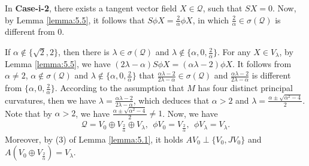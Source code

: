 \documentclass[reqno]{amsart}%
\theoremstyle{definition}
\numberwithin{equation}{section}
\begin{document}
In {\bf Case-i-2}, there exists a tangent vector field $X\in\mathcal{Q}$, such that
$SX=0$. Now, by Lemma \ref{lemma:5.5}, it follows that $S\phi X=\tfrac{2}{\alpha}\phi X$, in which $\tfrac{2}{\alpha}\in\sigma(\mathcal{Q})$ is different from $0$.

If $\alpha\notin\{\sqrt{2},2\}$, then there is $\lambda\in\sigma(\mathcal{Q})$ and
$\lambda\notin\{\alpha,0,\tfrac{2}{\alpha}\}$. For any $X\in V_\lambda$, by Lemma \ref{lemma:5.5}, we have $(2\lambda-\alpha)S\phi X=(\alpha\lambda-2)\phi X$. It follows from $\alpha\neq2$,
$\alpha\notin\sigma(\mathcal{Q})$ and $\lambda\notin\{\alpha,0,\tfrac{2}{\alpha}\}$ that $\frac{\alpha\lambda-2}{2\lambda-\alpha}\in\sigma(\mathcal{Q})$ and $\frac{\alpha\lambda-2}{2\lambda-\alpha}$
is different from $\{\alpha,0,\tfrac{2}{\alpha}\}$. According to the assumption that
$M$ has four distinct principal curvatures, then we have $\lambda=\frac{\alpha\lambda-2}{2\lambda-\alpha}$, which deduces that
$\alpha>2$ and $\lambda=\frac{\alpha\pm\sqrt{\alpha^2-4}}{2}$. Note that
by $\alpha>2$, we have $\frac{\alpha\pm\sqrt{\alpha^2-4}}{2}\neq1$.
Now, we have
$$
\begin{aligned}
\mathcal{Q}=V_0\oplus V_{\tfrac{2}{\alpha}}\oplus V_{\lambda}, \ \ \phi V_0= V_{\tfrac{2}{\alpha}},\ \ \phi V_\lambda=V_\lambda.
\end{aligned}
$$
Moreover, by (3) of Lemma \ref{lemma:5.1}, it holds $AV_{0}\perp \{V_{0},JV_{0}\}$
and $A(V_{0}\oplus V_{\tfrac{2}{\alpha}})=V_\lambda$.
\end{document}
